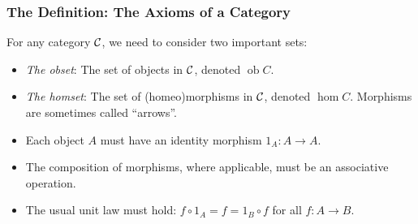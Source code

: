 \documentclass{beamer}
\numberwithin{figure}{section}
\DeclareMathOperator{\catobj}{ob}
\DeclareMathOperator{\cathom}{hom}
\newcommand{\arbcat}[1]{\ensuremath\mathcal{#1}}
\begin{document}
\begin{frame}
        \frametitle{The Definition: The Axioms of a Category}
        For any category $\arbcat{C}$, we need to consider two important sets:
        \begin{itemize}
                \item \emph{The obset}: The set of objects in $\arbcat{C}$,
                        denoted $\catobj{C}$.
                \item \emph{The homset}: The set of (homeo)morphisms in
                        $\arbcat{C}$, denoted $\cathom{C}$. Morphisms are
                        sometimes called ``arrows''.
        \end{itemize}
        \begin{itemize}
                \item Each object $A$ must have an identity morphism $1_A \colon
                        A \to A$.
                \item The composition of morphisms, where applicable, must be an
                        associative operation.
                \item The usual unit law must hold: $f \circ 1_A = f = 1_B \circ
                        f$ for all $f \colon A \to B$.
        \end{itemize}
\end{frame}
\end{document}
